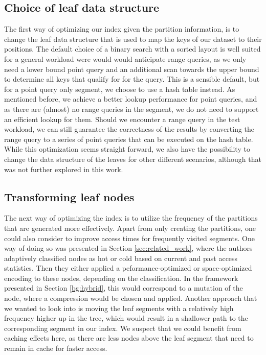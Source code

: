 \subsection{Choice of leaf data structure}
The first way of optimizing our index given the partition information, is to change the leaf data structure that is used to map the keys of our dataset to their positions. The default choice of a binary search with a sorted layout is well suited for a general workload were would would anticipate range queries, as we only need a lower bound point query and an additional scan towards the upper bound to determine all keys that qualify for for the query. This is a sensible default, but for a point query only segment, we choose to use a hash table instead. As mentioned before, we achieve a better lookup performance for point queries, and as there are (almost) no range queries in the segment, we do not need to support an efficient lookup for them. Should we encounter a range query in the test workload, we can still guarantee the correctness of the results by converting the range query to a series of point queries that can be executed on the hash table. While this optimization seems straight forward, we also have the possibility to change the data structure of the leaves for other different scenarios, although that was not further explored in this work.

\subsection{Transforming leaf nodes}
The next way of optimizing the index is to utilize the frequency of the partitions that are generated more effectively. Apart from only creating the partitions, one could also consider to improve access times for frequently visited segments. One way of doing so was presented in Section \ref{sec:related_work}, where the authors adaptively classified nodes as hot or cold based on current and past access statistics. Then they either applied a peformance-optimized or space-optimized encoding to these nodes, depending on the classification. In the framework presented in Section \ref{bg:hybrid}, this would correspond to a mutation of the node, where a compression would be chosen and applied. Another approach that we wanted to look into is moving the leaf segments with a relatively high frequency higher up in the tree, which would result in a shallower path to the corresponding segment in our index. We suspect that we could benefit from caching effects here, as there are less nodes above the leaf segment that need to remain in cache for faster access. 